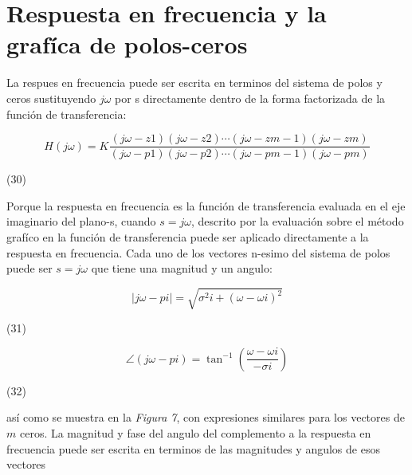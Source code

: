 \documentclass[10pt,a4paper]{article}
\begin{document}
\section{Respuesta en frecuencia y la grafíca de polos-ceros}
La respues en frecuencia puede ser escrita en terminos del sistema de polos y ceros sustituyendo $j\omega$ por s directamente dentro de la forma factorizada de la función de transferencia:
\begin{center}
  \[H(j\omega)=K \frac{(j\omega-z{\scriptscriptstyle 1})(j\omega-z{\scriptscriptstyle 2})\cdots(j\omega-z{\scriptscriptstyle m-1})(j\omega-z{\scriptscriptstyle m})}{(j\omega-p{\scriptscriptstyle 1})(j\omega -p{\scriptscriptstyle 2})\cdots(j\omega -p{\scriptscriptstyle m-1})(j\omega -p{\scriptscriptstyle m})}\]
  \begin{minipage}{0.9\textwidth}
    \begin{flushright}
      (30)
    \end{flushright}
  \end{minipage}
\end{center}
Porque la respuesta en frecuencia es la función de transferencia evaluada en el eje imaginario del plano-s, cuando $s=j\omega$, descrito por la evaluación sobre el método grafíco en la función de transferencia puede ser aplicado directamente a la respuesta en frecuencia. Cada uno de los vectores n-esimo del sistema de polos puede ser $s=j\omega$ que tiene una magnitud y un angulo:
\begin{center}
  \[|j\omega-p{\scriptscriptstyle i}| = \sqrt{\sigma^2{\scriptscriptstyle i}+(\omega-\omega{\scriptscriptstyle i})^2}\]
  \begin{minipage}{0.9\textwidth}
    \begin{flushright}
      (31)
    \end{flushright}
  \end{minipage}
  \[\angle(j\omega-p{\scriptscriptstyle i})= \tan^{-1}\left(\frac{\omega-\omega{\scriptscriptstyle i}}{-\sigma{\scriptscriptstyle i}}\right)\]
  \begin{minipage}{0.9\textwidth}
    \begin{flushright}
      (32)
    \end{flushright}
  \end{minipage}
\end{center}
así como se muestra en la \textit{Figura 7}, con expresiones similares para los vectores de $m$ ceros. La magnitud y fase del angulo del complemento a la respuesta en frecuencia puede ser escrita en terminos de las magnitudes y angulos de esos vectores
\end{document}
